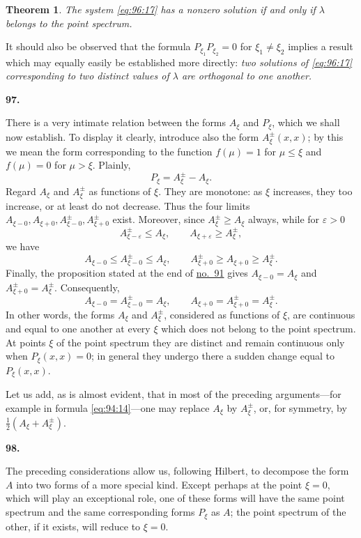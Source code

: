 \documentclass[
  paper=b5,
  fontsize=13pt,
  twoside=true,
  open=any,
  bookmarkpackage=false,
  chapterprefix=true,
  headings=normal
]{scrbook}
\newtheorem*{theorem}{Theorem}
\theoremstyle{definition}
\newcommand{\numberedparagraph}[1]{%
  \par\medskip\phantomsection\label{sec:#1}%
  \noindent\textbf{#1.}\enspace
}
\begin{document}
\begin{theorem}
The system \eqref{eq:96:17} has a nonzero solution if and only if
\(\lambda\) belongs to the point spectrum.
\end{theorem}

It should also be observed that the formula
\(P_{\xi_1}P_{\xi_2}=0\) for \(\xi_1\ne\xi_2\) implies a result which may
equally easily be established more directly: \emph{two solutions of
\eqref{eq:96:17} corresponding to two distinct values of \(\lambda\) are
orthogonal to one another.}

\numberedparagraph{97}
There is a very intimate relation between the forms \(A_\xi\) and \(P_\xi\),
which we shall now establish.  To display it clearly, introduce also the form
\(A_\xi^{\pm}(x,x)\); by this we mean the form corresponding to the function
\(f(\mu)=1\) for \(\mu\le\xi\) and \(f(\mu)=0\) for \(\mu>\xi\).  Plainly,
\[
  P_\xi=A_\xi^{\pm}-A_\xi.
\]
Regard \(A_\xi\) and \(A_\xi^{\pm}\) as functions of \(\xi\).  They are monotone:
as \(\xi\) increases, they too increase, or at least do not decrease.  Thus
the four limits
\(A_{\xi-0},A_{\xi+0},A^{\pm}_{\xi-0},A^{\pm}_{\xi+0}\) exist.  Moreover, since
\(A_\xi^{\pm}\ge A_\xi\) always, while for \(\varepsilon>0\)
\[
  A^{\pm}_{\xi-\varepsilon}\le A_\xi,
  \qquad A_{\xi+\varepsilon}\ge A_\xi^{\pm},
\]
we have
\[
  A_{\xi-0}\le A^{\pm}_{\xi-0}\le A_\xi,
  \qquad
  A^{\pm}_{\xi+0}\ge A_{\xi+0}\ge A_\xi^{\pm}.
\]
Finally, the proposition stated at the end of
\hyperref[sec:91]{no.~91} gives
\(A_{\xi-0}=A_\xi\) and \(A^{\pm}_{\xi+0}=A_\xi^{\pm}\).  Consequently,
\[
  A_{\xi-0}=A^{\pm}_{\xi-0}=A_\xi,
  \qquad
  A_{\xi+0}=A^{\pm}_{\xi+0}=A_\xi^{\pm}.
\]
In other words, the forms \(A_\xi\) and \(A_\xi^{\pm}\), considered as functions
of \(\xi\), are continuous and equal to one another at every \(\xi\) which
does not belong to the point spectrum.  At points \(\xi\) of the point
spectrum they are distinct and remain continuous only when
\(P_\xi(x,x)=0\); in general they undergo there a sudden change equal to
\(P_\xi(x,x)\).

Let us add, as is almost evident, that in most of the preceding arguments---for
example in formula \eqref{eq:94:14}---one may replace \(A_\xi\) by
\(A_\xi^{\pm}\), or, for symmetry, by
\(\tfrac12(A_\xi+A_\xi^{\pm})\).

\numberedparagraph{98}
The preceding considerations allow us, following Hilbert, to decompose the
form \(A\) into two forms of a more special kind.  Except perhaps at the point
\(\xi=0\), which will play an exceptional role, one of these forms will have
the same point spectrum and the same corresponding forms \(P_\xi\) as \(A\);
the point spectrum of the other, if it exists, will reduce to \(\xi=0\).
\end{document}
